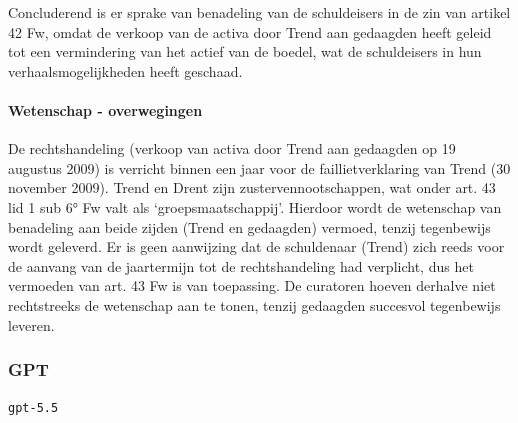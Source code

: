 \documentclass[
  dutch,
  a4paper,
]{article}
\begin{document}
Concluderend is er sprake van benadeling van de schuldeisers in de zin van artikel 42 Fw, omdat de verkoop van de activa door Trend aan gedaagden heeft geleid tot een vermindering van het actief van de boedel, wat de schuldeisers in hun verhaalsmogelijkheden heeft geschaad.

\paragraph{Wetenschap - overwegingen}\label{wetenschap---overwegingen-63}

De rechtshandeling (verkoop van activa door Trend aan gedaagden op 19 augustus 2009) is verricht binnen een jaar voor de faillietverklaring van Trend (30 november 2009). Trend en Drent zijn zustervennootschappen, wat onder art. 43 lid 1 sub 6° Fw valt als `groepsmaatschappij'. Hierdoor wordt de wetenschap van benadeling aan beide zijden (Trend en gedaagden) vermoed, tenzij tegenbewijs wordt geleverd. Er is geen aanwijzing dat de schuldenaar (Trend) zich reeds voor de aanvang van de jaartermijn tot de rechtshandeling had verplicht, dus het vermoeden van art. 43 Fw is van toepassing. De curatoren hoeven derhalve niet rechtstreeks de wetenschap aan te tonen, tenzij gedaagden succesvol tegenbewijs leveren.

\newpage


\subsubsection{GPT}\label{gpt-21}

\texttt{gpt-5.5}
\end{document}
